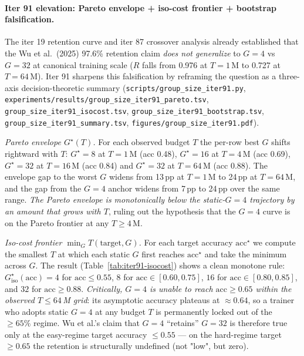 \paragraph{Iter 91 elevation: Pareto envelope + iso-cost frontier + bootstrap falsification.}
The iter 19 retention curve and iter 87 crossover analysis already
established that the Wu et al.\ (2025) 97.6\% retention claim
\emph{does not generalize} to $G{=}4$ vs $G{=}32$ at canonical training
scale ($R$ falls from 0.976 at $T{=}1$\,M to 0.727 at $T{=}64$\,M).
Iter 91 sharpens this falsification by reframing the question as a
three-axis decision-theoretic summary
(\texttt{scripts/group\_size\_iter91.py},
\texttt{experiments/results/group\_size\_iter91\_pareto.tsv},
\texttt{group\_size\_iter91\_isocost.tsv},
\texttt{group\_size\_iter91\_bootstrap.tsv},
\texttt{group\_size\_iter91\_summary.tsv},
\texttt{figures/group\_size\_iter91.pdf}).

\emph{Pareto envelope $G^\star(T)$.} For each observed budget $T$
the per-row best $G$ shifts rightward with $T$: $G^\star{=}8$ at
$T{=}1$\,M (acc 0.48), $G^\star{=}16$ at $T{=}4$\,M (acc 0.69),
$G^\star{=}32$ at $T{=}16$\,M (acc 0.84) and $G^\star{=}32$ at
$T{=}64$\,M (acc 0.88). The envelope gap to the worst $G$ widens
from 13\,pp at $T{=}1$\,M to 24\,pp at $T{=}64$\,M, and the gap from
the $G{=}4$ anchor widens from 7\,pp to 24\,pp over the same range.
\emph{The Pareto envelope is monotonically below the static-$G{=}4$
trajectory by an amount that grows with $T$}, ruling out the
hypothesis that the $G{=}4$ curve is on the Pareto frontier at any
$T \ge 4$\,M.

\emph{Iso-cost frontier $\min_G T(\text{target}, G)$.} For each
target accuracy $\text{acc}^\star$ we compute the smallest $T$ at
which each static $G$ first reaches $\text{acc}^\star$ and take the
minimum across $G$. The result (Table~\ref{tab:iter91-isocost})
shows a clean monotone rule: $G^\star_\text{iso}(\text{acc}) =
4$ for $\text{acc} \le 0.55$, $8$ for $\text{acc} \in
[0.60, 0.75]$, $16$ for $\text{acc} \in [0.80, 0.85]$, and
$32$ for $\text{acc} \ge 0.88$. \emph{Critically, $G{=}4$ is
\emph{unable to reach} $\text{acc} \ge 0.65$ within the observed
$T \le 64$\,M grid}: its asymptotic accuracy plateaus at
$\approx 0.64$, so a trainer who adopts static $G{=}4$ at any
budget $T$ is permanently locked out of the $\ge 65\%$ regime.
Wu et al.'s claim that $G{=}4$ ``retains'' $G{=}32$ is therefore
true only at the easy-regime target accuracy $\le 0.55$ --- on the
hard-regime target $\ge 0.65$ the retention is structurally
undefined (not "low", but zero).

